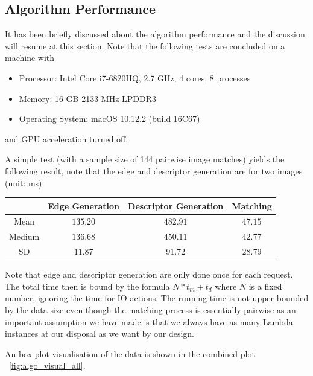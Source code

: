 \subsection{Algorithm Performance}
\label{sec:algorithm}

It has been briefly discussed about the algorithm performance and the discussion will resume at this section. Note that the following tests are concluded on a machine with

\begin{itemize}
	\item Processor: Intel Core i7-6820HQ, 2.7 GHz, 4 cores, 8 processes
	\item Memory: 16 GB 2133 MHz LPDDR3
	\item Operating System: macOS 10.12.2 (build 16C67)
\end{itemize}

and GPU acceleration turned off.

A simple test (with a sample size of 144 pairwise image matches) yields the following result, note that the edge and descriptor generation are for two images (unit: ms):

\begin{center}
\begin{tabular}{c|c c c}
        & Edge Generation & Descriptor Generation & Matching \\
\hline
Mean    & $135.20$       & $482.91$              & $47.15$  \\
Medium  & $136.68$       & $450.11$              & $42.77$  \\
SD      & $11.87$        & $91.72$               & $28.79$
\end{tabular}
\end{center}

Note that edge and descriptor generation are only done once for each request. The total time then is bound by the formula $N * t_m + t_d$ where $N$ is a fixed number, ignoring the time for IO actions. The running time is not upper bounded by the data size even though the matching process is essentially pairwise as an important assumption we have made is that we always have as many Lambda instances at our disposal as we want by our design.

An box-plot visualisation of the data is shown in the combined plot ~\ref{fig:algo_visual_all}.

